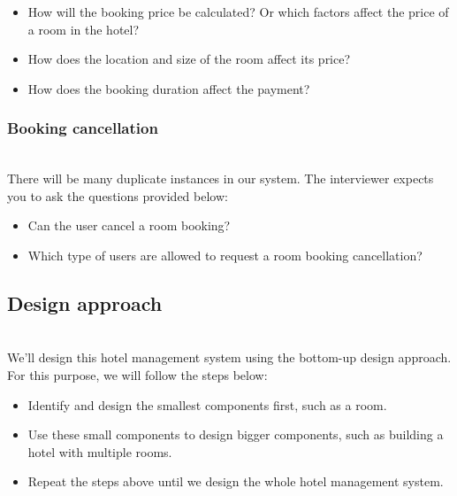 \begin{itemize}
\item
\protect{}\label{hjJ5RcjdkG15T_wg89Wju}
How will the booking price be calculated? Or which factors affect the price of a room in the hotel?
\item
\protect{}\label{tsckLwWLbyI5-eLBt6nrA}
How does the location and size of the room affect its price?
\item
\protect{}\label{EgyNktkT3a2KQFv6ZWYG0}
How does the booking duration affect the payment?
\end{itemize}

\subsubsection{Booking cancellation}\label{qHzH4gK5pLq_-QEHinXK9}
\\
There will be many duplicate instances in our system. The interviewer expects you to ask the questions provided below:

\begin{itemize}
\item
\protect{}\label{LJ-is2qBXxwokTq-ExJ12}
Can the user cancel a room booking?
\item
\protect{}\label{-Qh-g9d6ifeoQnyTHvOy2}
Which type of users are allowed to request a room booking cancellation?
\end{itemize}

\subsection{Design approach}\label{fot8-Doqrg9Zx3EOjlsx2}
\\
We'll design this hotel management system using the bottom-up design approach. For this purpose, we will follow the steps below:

\begin{itemize}
\item
\protect{}\label{wDS1Vzycoao8ZwoMTMOqL}
Identify and design the smallest components first, such as a room.
\item
\protect{}\label{GQOk9F9SmajBnOxUiHdZm}
Use these small components to design bigger components, such as building a hotel with multiple rooms.
\item
\protect{}\label{Vqaob7p7SDGo7oK_Fyi7T}
Repeat the steps above until we design the whole hotel management system.
\end{itemize}

